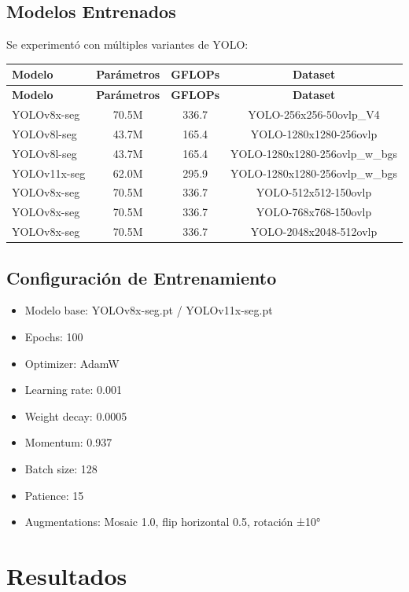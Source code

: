 \documentclass[12pt,a4paper]{article}
\begin{document}
\subsection{Modelos Entrenados}

Se experimentó con múltiples variantes de YOLO:

\begin{longtable}{|l|c|c|c|}
\hline
\textbf{Modelo} & \textbf{Parámetros} & \textbf{GFLOPs} & \textbf{Dataset} \\ \hline
\endfirsthead
\hline
\textbf{Modelo} & \textbf{Parámetros} & \textbf{GFLOPs} & \textbf{Dataset} \\ \hline
\endhead
\hline
\endfoot
\hline
\endlastfoot
YOLOv8x-seg & 70.5M & 336.7 & YOLO-256x256-50ovlp\_V4 \\
YOLOv8l-seg & 43.7M & 165.4 & YOLO-1280x1280-256ovlp \\
YOLOv8l-seg & 43.7M & 165.4 & YOLO-1280x1280-256ovlp\_w\_bgs \\
YOLOv11x-seg & 62.0M & 295.9 & YOLO-1280x1280-256ovlp\_w\_bgs \\
YOLOv8x-seg & 70.5M & 336.7 & YOLO-512x512-150ovlp \\
YOLOv8x-seg & 70.5M & 336.7 & YOLO-768x768-150ovlp \\
YOLOv8x-seg & 70.5M & 336.7 & YOLO-2048x2048-512ovlp \\
\end{longtable}

\subsection{Configuración de Entrenamiento}

\begin{itemize}
    \item Modelo base: YOLOv8x-seg.pt / YOLOv11x-seg.pt
    \item Epochs: 100
    \item Optimizer: AdamW
    \item Learning rate: 0.001
    \item Weight decay: 0.0005
    \item Momentum: 0.937
    \item Batch size: 128
    \item Patience: 15
    \item Augmentations: Mosaic 1.0, flip horizontal 0.5, rotación ±10°
\end{itemize}

\section{Resultados}
\end{document}
